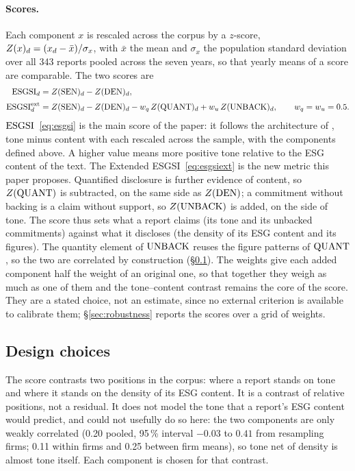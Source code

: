 \paragraph{Scores.} Each component $x$ is rescaled across the corpus by a
$z$-score, $Z(x)_d = (x_d - \bar{x}) / \sigma_x$, with $\bar x$ the mean and
$\sigma_x$ the population standard deviation over all 343 reports pooled across
the seven years, so that yearly means of a score are comparable. The two
scores are
\begin{align}
\label{eq:esgsi}
\mathrm{ESGSI}_d    &= Z(\mathrm{SEN})_d - Z(\mathrm{DEN})_d, \\[2pt]
\label{eq:esgsiext}
\mathrm{ESGSI}^{\mathrm{ext}}_d &= Z(\mathrm{SEN})_d - Z(\mathrm{DEN})_d - w_q\,Z(\mathrm{QUANT})_d + w_u\,Z(\mathrm{UNBACK})_d,
\qquad w_q = w_u = 0.5 .
\end{align}
$\mathrm{ESGSI}$~\eqref{eq:esgsi} is the main score of the paper: it follows the
architecture of \citet{lagasio2024}, tone minus content with each rescaled
across the sample, with the components defined above. A higher value means
more positive tone relative to the ESG content of the text. The Extended
ESGSI~\eqref{eq:esgsiext} is the new metric this paper proposes. Quantified
disclosure is further evidence of content, so $Z(\mathrm{QUANT})$ is subtracted, on
the same side as $Z(\mathrm{DEN})$; a commitment without backing is a claim without
support, so $Z(\mathrm{UNBACK})$ is added, on the side of tone. The score thus sets
what a report claims (its tone and its unbacked commitments) against what it
discloses (the density of its ESG content and its figures). The quantity
element of $\mathrm{UNBACK}$ reuses the figure patterns of $\mathrm{QUANT}$, so the two are
correlated by construction (\S\ref{sec:method-choices}). The weights give each added
component half the weight of an original one, so that together they weigh as
much as one of them and the tone--content contrast remains the core of the
score. They are a stated choice, not an estimate, since no external criterion
is available to calibrate them; \S\ref{sec:robustness} reports the scores over
a grid of weights.

\subsection{Design choices}
\label{sec:method-choices}

The score contrasts two positions in the corpus: where a report stands on
tone and where it stands on the density of its ESG content. It is a contrast of
relative positions, not a residual. It does not model the tone that a report's
ESG content would predict, and could not usefully do so here: the two components
are only weakly correlated (0.20 pooled, 95\,\% interval $-0.03$ to $0.41$
from resampling firms; 0.11 within firms and 0.25 between firm means), so tone
net of density is almost tone itself. Each component is chosen for that
contrast.

